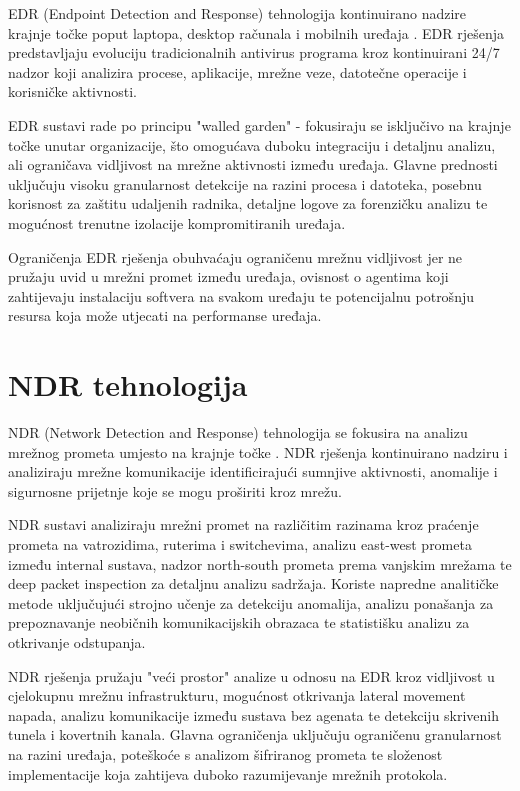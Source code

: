 \documentclass[utf8, seminar]{fer}
\begin{document}
EDR (Endpoint Detection and Response) tehnologija kontinuirano nadzire krajnje točke poput laptopa, desktop računala i mobilnih uređaja \cite{crowdstrike_edr, microsoft_edr}. EDR rješenja predstavljaju evoluciju tradicionalnih antivirus programa kroz kontinuirani 24/7 nadzor koji analizira procese, aplikacije, mrežne veze, datotečne operacije i korisničke aktivnosti.

EDR sustavi rade po principu "walled garden" - fokusiraju se isključivo na krajnje točke unutar organizacije, što omogućava duboku integraciju i detaljnu analizu, ali ograničava vidljivost na mrežne aktivnosti između uređaja. Glavne prednosti uključuju visoku granularnost detekcije na razini procesa i datoteka, posebnu korisnost za zaštitu udaljenih radnika, detaljne logove za forenzičku analizu te mogućnost trenutne izolacije kompromitiranih uređaja.

Ograničenja EDR rješenja obuhvaćaju ograničenu mrežnu vidljivost jer ne pružaju uvid u mrežni promet između uređaja, ovisnost o agentima koji zahtijevaju instalaciju softvera na svakom uređaju te potencijalnu potrošnju resursa koja može utjecati na performanse uređaja.

\chapter{NDR tehnologija}

NDR (Network Detection and Response) tehnologija se fokusira na analizu mrežnog prometa umjesto na krajnje točke \cite{fortinet_ndr, cisco_ndr}. NDR rješenja kontinuirano nadziru i analiziraju mrežne komunikacije identificirajući sumnjive aktivnosti, anomalije i sigurnosne prijetnje koje se mogu proširiti kroz mrežu.

NDR sustavi analiziraju mrežni promet na različitim razinama kroz praćenje prometa na vatrozidima, ruterima i switchevima, analizu east-west prometa između internal sustava, nadzor north-south prometa prema vanjskim mrežama te deep packet inspection za detaljnu analizu sadržaja. Koriste napredne analitičke metode uključujući strojno učenje za detekciju anomalija, analizu ponašanja za prepoznavanje neobičnih komunikacijskih obrazaca te statistišku analizu za otkrivanje odstupanja.

NDR rješenja pružaju "veći prostor" analize u odnosu na EDR kroz vidljivost u cjelokupnu mrežnu infrastrukturu, mogućnost otkrivanja lateral movement napada, analizu komunikacije između sustava bez agenata te detekciju skrivenih tunela i kovertnih kanala. Glavna ograničenja uključuju ograničenu granularnost na razini uređaja, poteškoće s analizom šifriranog prometa te složenost implementacije koja zahtijeva duboko razumijevanje mrežnih protokola.
\end{document}
